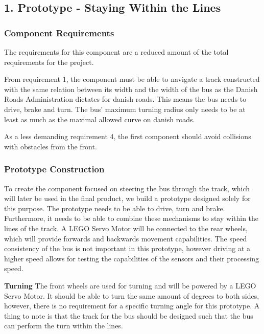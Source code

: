 \subsection{1. Prototype - Staying Within the Lines}

\subsubsection{Component Requirements}
The requirements for this component are a reduced amount of the total requirements for the project.

From requirement 1, the component must be able to navigate a track constructed with the same relation between its width and the width of the bus as the Danish Roads Administration dictates for danish roads. This means the bus needs to drive, brake and turn. The bus' maximum turning radius only needs to be at least as much as the maximal allowed curve on danish roads. 

As a less demanding requirement 4, the first component should avoid collisions with obstacles from the front. 

\subsubsection{Prototype Construction}
To create the component focused on steering the bus through the track, which will later be used in the final product, we build a prototype designed solely for this purpose. The prototype needs to be able to drive, turn and brake. Furthermore, it needs to be able to combine these mechanisms to stay within the lines of the track. A LEGO Servo Motor will be connected to the rear wheels, which will provide forwards and backwards movement capabilities. The speed consistency of the bus is not important in this prototype, however driving at a higher speed allows for testing the capabilities of the sensors and their processing speed.

\textbf{Turning}\newline
The front wheels are used for turning and will be powered by a LEGO Servo Motor. It should be able to turn the same amount of degrees to both sides, however, there is no requirement for a specific turning angle for this prototype. A thing to note is that the track for the bus should be designed such that the bus can perform the turn within the lines.

